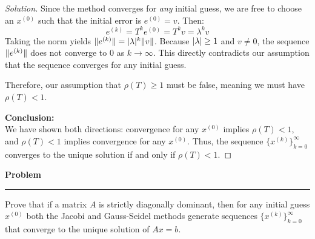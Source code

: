 \documentclass[11pt, a4paper]{article}
\DeclarePairedDelimiter\abs{\lvert}{\rvert}
\DeclarePairedDelimiter\norm{\lVert}{\rVert}
\newenvironment{problem}{%
  \begin{tcolorbox}[
    colback=blue!4!white,
    colframe=blue!38!black,
    boxrule=0.95pt,
    arc=3pt,
    left=11pt,
    right=11pt,
    top=10pt,
    bottom=11pt,
    before skip=12pt,
    after skip=14pt,
  ]
  \noindent\textbf{\textcolor{blue!35!black}{Problem}}\par\nointerlineskip
  {\color{blue!42!black}\rule{\linewidth}{0.55pt}}\par\vspace{0.55em}%
}{%
  \end{tcolorbox}%
}
\newif\ifsolutionnewpage
\newenvironment{solution}
  {\begin{proof}[Solution]}
  {\end{proof}\ifsolutionnewpage\newpage\fi}
\begin{document}
\begin{solution}
    Since the method converges for \emph{any} initial guess, we are free to choose an $x^{(0)}$ such that the initial error is $e^{(0)} = v$. Then:
    \[
    e^{(k)} = T^k e^{(0)} = T^k v = \lambda^k v
    \]
    Taking the norm yields $\norm{e^{(k)}} = \abs{\lambda}^k \norm{v}$. 
    Because $\abs{\lambda} \ge 1$ and $v \neq 0$, the sequence $\norm{e^{(k)}}$ does not converge to $0$ as $k \to \infty$. This directly contradicts our assumption that the sequence converges for any initial guess. 
    
    Therefore, our assumption that $\rho(T) \ge 1$ must be false, meaning we must have $\rho(T) < 1$.
    
    \vspace{1em}
    \textbf{Conclusion:} \\
    We have shown both directions: convergence for any $x^{(0)}$ implies $\rho(T) < 1$, and $\rho(T) < 1$ implies convergence for any $x^{(0)}$. Thus, the sequence $\{x^{(k)}\}_{k=0}^{\infty}$ converges to the unique solution if and only if $\rho(T) < 1$.
\end{solution}



\begin{problem}
    Prove that if a matrix $A$ is strictly diagonally dominant, then for any initial guess $x^{(0)}$ both the Jacobi and Gauss-Seidel methods generate sequences $\{x^{(k)}\}_{k=0}^{\infty}$ that converge to the unique solution of $Ax=b$.
\end{problem}
\end{document}

